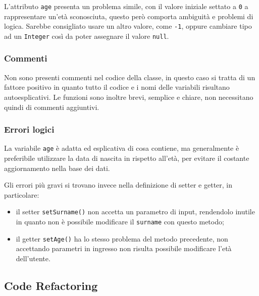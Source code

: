        L'attributo \texttt{age} presenta un problema simile, con il valore iniziale settato a \texttt{0} a rappresentare un'età sconosciuta, questo però comporta ambiguità e problemi di logica.
        Sarebbe consigliato usare un altro valore, come \texttt{-1}, oppure cambiare tipo ad un \texttt{Integer} così da poter assegnare il valore \texttt{null}.

        \subsubsection{Commenti}
        Non sono presenti commenti nel codice della classe, in questo caso si tratta di un fattore positivo in quanto tutto il codice e i nomi delle variabili risultano autoesplicativi.
        Le funzioni sono inoltre brevi, semplice e chiare, non necessitano quindi di commenti aggiuntivi.
        
        \subsubsection{Errori logici}
        La variabile \texttt{age} è adatta ed esplicativa di cosa contiene, ma generalmente è preferibile utilizzare la data di nascita in rispetto all'età, 
        per evitare il costante aggiornamento nella base dei dati.

        Gli errori più gravi si trovano invece nella definizione di setter e getter, in particolare:
        \begin{itemize}
            \item il setter \texttt{setSurname()} non accetta un parametro di input, rendendolo inutile in quanto non è possibile modificare il \texttt{surname} con questo metodo;
            \item il getter \texttt{setAge()} ha lo stesso problema del metodo precedente, non accettando parametri in ingresso non risulta possibile modificare l'età dell'utente.
        \end{itemize}
               
    \subsection{Code Refactoring}
        \inputminted[linenos, frame=lines]{java}{../new/User.java}

